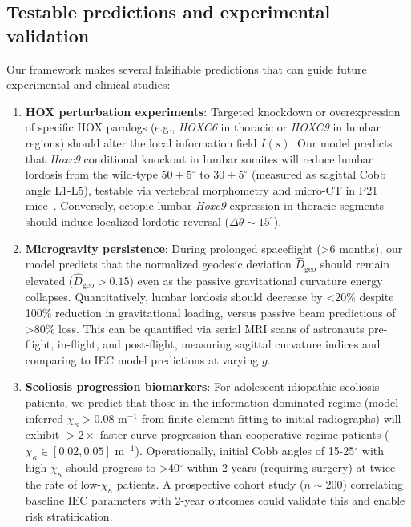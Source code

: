 \documentclass[11pt,a4paper]{article}
\begin{document}
\subsection{Testable predictions and experimental validation}
Our framework makes several falsifiable predictions that can guide future experimental and clinical studies:
\begin{enumerate}
\item \textbf{HOX perturbation experiments}: Targeted knockdown or overexpression of specific HOX paralogs (e.g., \textit{HOXC6} in thoracic or \textit{HOXC9} in lumbar regions) should alter the local information field $I(s)$. Our model predicts that \textit{Hoxc9} conditional knockout in lumbar somites will reduce lumbar lordosis from the wild-type $50 \pm 5^\circ$ to $30 \pm 5^\circ$ (measured as sagittal Cobb angle L1-L5), testable via vertebral morphometry and micro-CT in P21 mice~\cite{wellik2007hox}. Conversely, ectopic lumbar \textit{Hoxc9} expression in thoracic segments should induce localized lordotic reversal ($\Delta\theta \sim 15^\circ$).

\item \textbf{Microgravity persistence}: During prolonged spaceflight (>6 months), our model predicts that the normalized geodesic deviation $\widehat{D}_{\mathrm{geo}}$ should remain elevated ($\widehat{D}_{\mathrm{geo}} > 0.15$) even as the passive gravitational curvature energy collapses. Quantitatively, lumbar lordosis should decrease by <20\% despite 100\% reduction in gravitational loading, versus passive beam predictions of >80\% loss. This can be quantified via serial MRI scans of astronauts pre-flight, in-flight, and post-flight, measuring sagittal curvature indices and comparing to IEC model predictions at varying $g$.

\item \textbf{Scoliosis progression biomarkers}: For adolescent idiopathic scoliosis patients, we predict that those in the information-dominated regime (model-inferred $\chi_\kappa > 0.08$ m$^{-1}$ from finite element fitting to initial radiographs) will exhibit $>2\times$ faster curve progression than cooperative-regime patients ($\chi_\kappa \in [0.02, 0.05]$ m$^{-1}$). Operationally, initial Cobb angles of 15-25$^\circ$ with high-$\chi_\kappa$ should progress to >40$^\circ$ within 2 years (requiring surgery) at twice the rate of low-$\chi_\kappa$ patients. A prospective cohort study ($n \sim 200$) correlating baseline IEC parameters with 2-year outcomes could validate this and enable risk stratification.


\end{enumerate}
\end{document}
